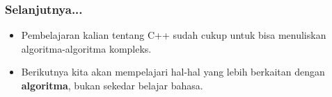 \begin{frame}
\frametitle{Selanjutnya...}
\begin{itemize}
  \item Pembelajaran kalian tentang C++ sudah cukup untuk bisa menuliskan algoritma-algoritma kompleks.
  \item Berikutnya kita akan mempelajari hal-hal yang lebih berkaitan dengan \textbf{algoritma}, bukan sekedar belajar bahasa.
\end{itemize}
\end{frame}


